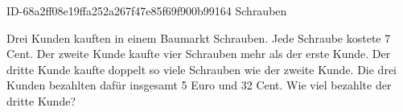 \begin{exercise}
      {ID-68a2ff08e19ffa252a267f47e85f69f900b99164}
      {Schrauben}
  \ifproblem\problem\par
    Drei Kunden kauften in einem Baumarkt Schrauben. Jede Schraube kostete
    7 Cent. Der zweite Kunde kaufte vier Schrauben mehr als der erste Kunde.
    Der dritte Kunde kaufte doppelt so viele Schrauben wie der zweite Kunde.
    Die drei Kunden bezahlten dafür insgesamt 5 Euro und 32 Cent.
    Wie viel bezahlte der dritte Kunde?
  \fi
\end{exercise}

